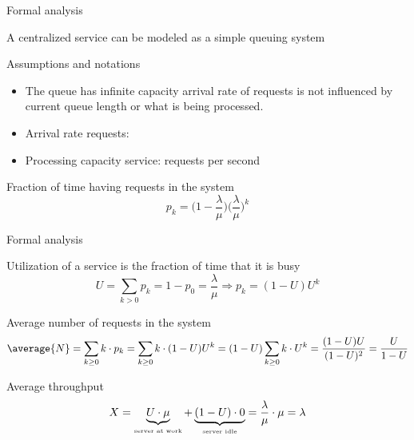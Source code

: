   \begin{slide}{Formal analysis}
    \begin{block}{A centralized service can be modeled as a simple queuing system}
      \centering{}
    \end{block}
    \begin{block}{Assumptions and notations}
      \begin{itemize}\tightlist
      \item The queue has infinite capacity \mathexpr{\Rightarrow} arrival rate of requests is not influenced
        by current queue length or what is being processed.
      \item Arrival rate requests: \mathexpr{\lambda}
      \item Processing capacity service: \mathexpr{\mu} requests per second
      \end{itemize}
    \end{block}
    \begin{alertblock}{Fraction of time having  requests in the system}
      \[ p_k = \bigl(1 - \frac{\lambda}{\mu}\bigr)\bigl(\frac{\lambda}{\mu}\bigr)^k \]
    \end{alertblock}
  \end{slide}
  \begin{slide}{Formal analysis}
    \begin{block}{Utilization  of a service is the fraction of time that it is busy}
      \[ U = \sum_{k > 0} p_k = 1 - p_0 = \frac{\lambda}{\mu} \Rightarrow p_k = (1-U) U^k \]
    \end{block}
    \begin{block}{Average number of requests in the system}
      \[ \average{N} = \sum_{k\geq 0} k \cdot p_k = \sum_{k \geq 0} k \cdot (1-U)U^k = (1-U)\sum_{k\geq 0} k\cdot U^k
      = \frac{(1-U)U}{(1-U)^2} = \frac{U}{1-U} \]
    \end{block}
    \begin{block}{Average throughput}
      \[ X = \underbrace{U \cdot \mu}_{\mbox{\tiny server at work}} + \underbrace{(1-U) \cdot 0}_{\mbox{\tiny
        server idle}} = \frac{\lambda}{\mu} \cdot \mu = \lambda \]
    \end{block}
  \end{slide}
